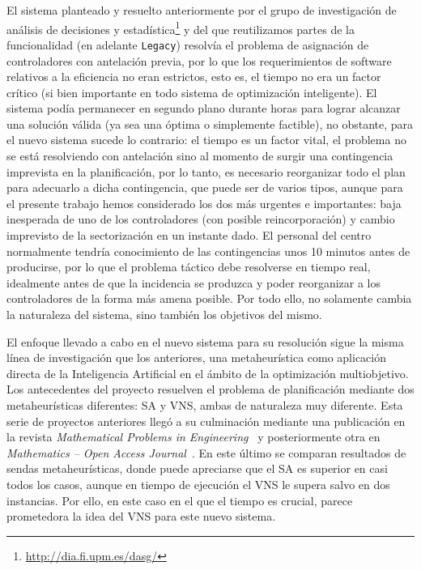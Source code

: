 El sistema planteado y resuelto anteriormente por el grupo de investigación de análisis de decisiones y estadística\footnote{\url{http://dia.fi.upm.es/dasg/}} y del que reutilizamos partes de la funcionalidad (en adelante \texttt{Legacy}) resolvía el problema de asignación de controladores con antelación previa, por lo que los requerimientos de software relativos a la eficiencia no eran estrictos, esto es, el tiempo no era un factor crítico (si bien importante en todo sistema de optimización inteligente). El sistema podía permanecer en segundo plano durante horas para lograr alcanzar una solución válida (ya sea una óptima o simplemente factible), no obstante, para el nuevo sistema sucede lo contrario: 
el tiempo es un factor vital, el problema no se está resolviendo con antelación sino al momento de surgir una contingencia imprevista en la planificación, por lo tanto, es necesario reorganizar todo el plan para adecuarlo a dicha contingencia, que puede ser de varios tipos, aunque para el presente trabajo hemos considerado los dos más urgentes e importantes: baja inesperada de uno de los controladores (con posible reincorporación) y cambio imprevisto de la sectorización en un instante dado. 
El personal del centro normalmente tendría conocimiento de las contingencias unos 10 minutos antes de producirse, por lo que el problema táctico debe resolverse en tiempo real, idealmente antes de que la incidencia se produzca y poder reorganizar a los controladores de la forma más amena posible.
Por todo ello, no solamente cambia la naturaleza del sistema, sino también los objetivos del mismo.

El enfoque llevado a cabo en el nuevo sistema para su resolución sigue la misma línea de investigación que los anteriores, una metaheurística como aplicación directa de la Inteligencia Artificial en el ámbito de la optimización multiobjetivo.
Los antecedentes del proyecto resuelven el problema de planificación mediante dos metaheurísticas diferentes: \gls{SA} y \gls{VNS}, ambas de naturaleza muy diferente. 
Esta serie de proyectos anteriores llegó a su culminación mediante una publicación en la revista \textit{Mathematical Problems in Engineering}~\cite{articulo1} y posteriormente otra en \textit{Mathematics -- Open Access Journal}~\cite{articulo2}. 
En este último se comparan resultados de sendas metaheurísticas, donde puede apreciarse que el SA es superior en casi todos los casos, aunque en tiempo de ejecución el VNS le supera salvo en dos instancias. Por ello, en este caso en el que el tiempo es crucial, parece prometedora la idea del VNS para este nuevo sistema. 

